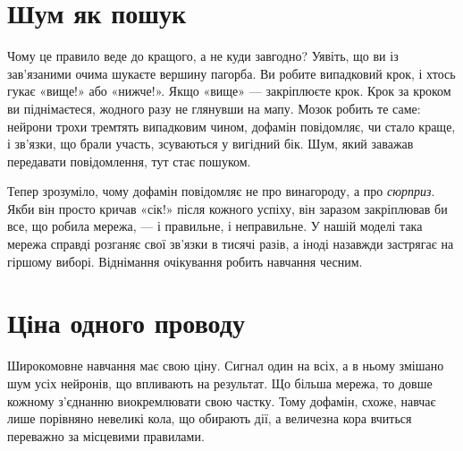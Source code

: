 
\section*{Шум як пошук}

Чому це правило веде до кращого, а не куди завгодно? Уявіть, що ви із зав'язаними очима шукаєте вершину пагорба. Ви робите випадковий крок, і хтось гукає «вище!» або «нижче!». Якщо «вище» --- закріплюєте крок. Крок за кроком ви піднімаєтеся, жодного разу не глянувши на мапу. Мозок робить те саме: нейрони трохи тремтять випадковим чином, дофамін повідомляє, чи стало краще, і зв'язки, що брали участь, зсуваються у вигідний бік. Шум, який заважав передавати повідомлення, тут стає пошуком.

Тепер зрозуміло, чому дофамін повідомляє не про винагороду, а про \emph{сюрприз}. Якби він просто кричав «сік!» після кожного успіху, він заразом закріплював би все, що робила мережа, --- і правильне, і неправильне. У нашій моделі така мережа справді розганяє свої зв'язки в тисячі разів, а іноді назавжди застрягає на гіршому виборі. Віднімання очікування робить навчання чесним.

\section*{Ціна одного проводу}

Широкомовне навчання має свою ціну. Сигнал один на всіх, а в ньому змішано шум усіх нейронів, що впливають на результат. Що більша мережа, то довше кожному з'єднанню виокремлювати свою частку. Тому дофамін, схоже, навчає лише порівняно невеликі кола, що обирають дії, а величезна кора вчиться переважно за місцевими правилами.

